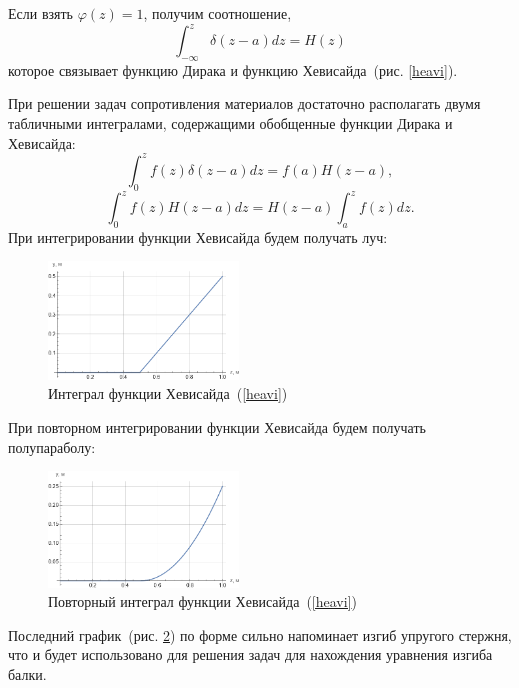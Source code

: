 \documentclass[12pt, a4paper]{article}
\begin{document}
Если взять $\varphi (z) = 1$, получим соотношение, 
\begin{equation}
	\label{heavi}
	\int_{-\infty}^z \delta (z - a) dz = 
	H(z)
\end{equation}
которое связывает функцию Дирака и функцию Хевисайда~(рис. \ref{heavi}).

При решении задач сопротивления материалов достаточно располагать двумя табличными интегралами, содержащими обобщенные функции
Дирака и Хевисайда:
\begin{equation}
	\label{dirakint}
	\int_0^z f(z) \delta(z - a) d z = f(a)H(z - a),
\end{equation}
\begin{equation}
	\label{heaviint}
	\int_0^z f(z) H(z - a) d z = H(z - a)\int_a^z f(z) d z.
\end{equation}
\newpage
При интегрировании функции Хевисайда будем получать луч:
\begin{figure}[!h]
	\centering
	\includegraphics[width=0.45\textwidth]{intHeav}%
	\caption{Интеграл функции Хевисайда~(\ref{heavi})}
	\vspace*{-2mm}
	\label{intHeav}
\end{figure}
\newline
При повторном интегрировании функции Хевисайда будем получать полупараболу:
\begin{figure}[!h]
	\centering
	\includegraphics[width=0.45\textwidth]{int2Heav}%
	\caption{Повторный интеграл функции Хевисайда~(\ref{heavi})}
	\vspace*{-2mm}
	\label{int2Heav}
\end{figure}
\newline
Последний график~(рис. \ref{int2Heav}) по форме сильно напоминает изгиб упругого стержня, что и будет использовано для решения задач для нахождения уравнения изгиба балки.
\end{document}
